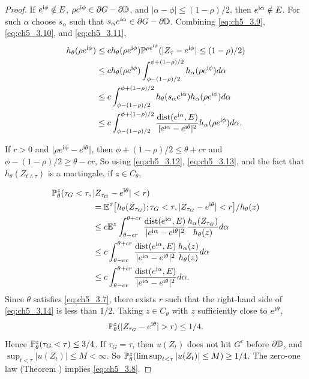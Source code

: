 \begin{proof}
If $e^{\im\phi} \notin E$, $\rho e^{\im\phi} \in \partial G - \partial\D$, and $|\alpha - \phi| \leq (1-\rho)/2$, then $e^{\im\alpha} \notin E$. For such $\alpha$ choose $s_\alpha$ such that $s_\alpha e^{i\alpha} \in \partial G - \partial\D$. Combining \eqref{eq:ch5_3.9}, \eqref{eq:ch5_3.10}, and \eqref{eq:ch5_3.11},
\begin{align}\label{eq:ch5_3.13}
    h_\theta(\rho e^{\im\phi}) &\leq ch_\theta(\rho e^{\im\phi})\P^{\rho e^{\im\phi}}(|Z_\tau - e^{\im\phi}| \leq (1-\rho)/2) \\
    &\leq ch_\theta(\rho e^{\im\phi})\int_{\phi-(1-\rho)/2}^{\phi+(1-\rho)/2} h_\alpha(\rho e^{\im\phi})d\alpha \notag \\
    &\leq c\int_{\phi-(1-\rho)/2}^{\phi+(1-\rho)/2} h_\theta(s_\alpha e^{\im\alpha}) h_\alpha(\rho e^{\im\phi})d\alpha \notag \\
    &\leq c\int_{\phi-(1-\rho)/2}^{\phi+(1-\rho)/2} \frac{\dist(e^{\im\alpha},E)}{|e^{\im\alpha} - e^{\im\theta}|^2}h_\alpha(\rho e^{\im\phi})d\alpha. \notag
\end{align}

If $r>0$ and $|\rho e^{\im\phi} - e^{\im \theta}|$, then $\phi+(1-\rho)/2\leq \theta + cr$ and $\phi-(1-\rho)/2\geq \theta - cr$, So using \eqref{eq:ch5_3.12}, \eqref{eq:ch5_3.13}, and the fact that $h_\theta(Z_{t\wedge\tau})$ is a martingale, if $z \in C_\theta$,

\mpagebreak
\begin{align}\label{eq:ch5_3.14}
    \P_\theta^z(\tau_G < \tau,\,&|Z_{\tau_G} - e^{\im\theta}| < r) \\
    &= \E^z\big[h_\theta(Z_{\tau_G}); \tau_G < \tau,|Z_{\tau_G} - e^{\im \theta}| < r\big]/h_\theta(z) \notag \\
    &\leq c\E^z \int_{\theta-cr}^{\theta+cr} \frac{\dist(e^{\im\alpha},E)}{|e^{\im\alpha} - e^{\im\theta}|^2}\frac{h_\alpha(Z_{\tau_G})}{h_\theta(z)} d\alpha \notag \\
    &\leq c\int_{\theta-cr}^{\theta+cr} \frac{\dist(e^{\im\alpha},E)}{|e^{\im\alpha} - e^{\im\theta}|^2}\frac{h_\alpha(z)}{h_\theta(z)} d\alpha \notag \\
    &\leq c\int_{\theta-cr}^{\theta+cr} \frac{\dist(e^{\im\alpha},E)}{|e^{\im\alpha} - e^{\im\theta}|^2} d\alpha. \notag
\end{align}
Since $\theta$ satisfies \eqref{eq:ch5_3.7}, there exists $r$ such that the right-hand side of \eqref{eq:ch5_3.14} is less than $1/2$. Taking $z \in C_\theta$ with $z$ sufficiently close to $e^{\im\theta}$,
\[
    \P_\theta^z(|Z_{\tau_G} - e^{\im\theta}| > r) \leq 1/4.
\]
Hence $\P_\theta^z(\tau_G < \tau) \leq 3/4$. If $\tau_G = \tau$, then $u(Z_t)$ does not hit $G^c$ before $\partial\D$, and $\sup_{t<\tau} |u(Z_t)| \leq M < \infty$. So $\P_\theta^z(\limsup_{t<\tau} |u(Z_t)| \leq M) \geq 1/4$. The zero-one law (Theorem ) implies \eqref{eq:ch5_3.8}.


\end{proof}
